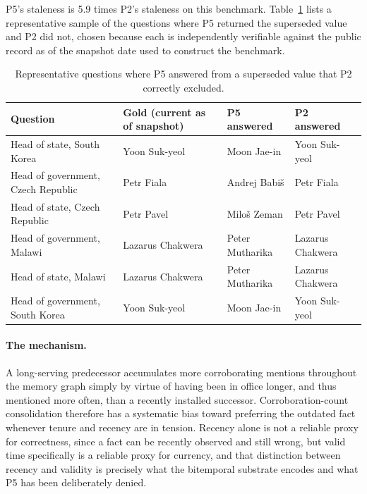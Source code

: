 P5's staleness is 5.9 times P2's staleness on this benchmark. Table~\ref{tab:rq3-failures} lists a representative sample of the questions where P5 returned the superseded value and P2 did not, chosen because each is independently verifiable against the public record as of the snapshot date used to construct the benchmark.

\begin{table}[H]
\centering
\caption{Representative questions where P5 answered from a superseded value that P2 correctly excluded.}
\label{tab:rq3-failures}
\small
\begin{tabular}{p{3.3cm}p{2.6cm}p{2.6cm}p{2.6cm}}
\toprule
Question & Gold (current as of snapshot) & P5 answered & P2 answered \\
\midrule
Head of state, South Korea & Yoon Suk-yeol & Moon Jae-in & Yoon Suk-yeol \\
Head of government, Czech Republic & Petr Fiala & Andrej Babi\v{s} & Petr Fiala \\
Head of state, Czech Republic & Petr Pavel & Milo\v{s} Zeman & Petr Pavel \\
Head of government, Malawi & Lazarus Chakwera & Peter Mutharika & Lazarus Chakwera \\
Head of state, Malawi & Lazarus Chakwera & Peter Mutharika & Lazarus Chakwera \\
Head of government, South Korea & Yoon Suk-yeol & Moon Jae-in & Yoon Suk-yeol \\
\bottomrule
\end{tabular}
\end{table}

\paragraph{The mechanism.} A long-serving predecessor accumulates more corroborating mentions throughout the memory graph simply by virtue of having been in office longer, and thus mentioned more often, than a recently installed successor. Corroboration-count consolidation therefore has a systematic bias toward preferring the outdated fact whenever tenure and recency are in tension. Recency alone is not a reliable proxy for correctness, since a fact can be recently observed and still wrong, but valid time specifically is a reliable proxy for currency, and that distinction between recency and validity is precisely what the bitemporal substrate encodes and what P5 has been deliberately denied.

